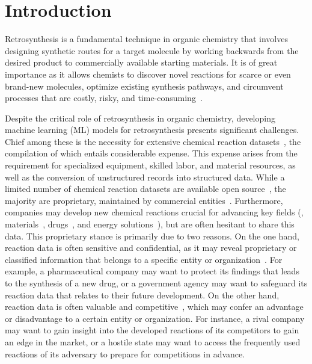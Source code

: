 \section{Introduction}\label{sec:intro}

Retrosynthesis is a fundamental technique in organic chemistry that involves designing synthetic routes for a target molecule by working backwards from the desired product to commercially available starting materials. It is of great importance as it allows chemists to discover novel reactions for scarce or even brand-new molecules, optimize existing synthesis pathways, and circumvent processes that are costly, risky, and time-consuming~\citep{subbaraman2011flawed,struble2020current}.

Despite the critical role of retrosynthesis in organic chemistry, developing machine learning (ML) models for retrosynthesis presents significant challenges. Chief among these is the necessity for extensive chemical reaction datasets~\citep{zhang2024retrosynthesis}, the compilation of which entails considerable expense. This expense arises from the requirement for specialized equipment, skilled labor, and material resources, as well as the conversion of unstructured records into structured data. While a limited number of chemical reaction datasets are available open source~\citep{lowe2012extraction,Lowe2017}, the majority are proprietary, maintained by commercial entities~\citep{goodman2009computer,lawson2014making,mayfield2017pistachio}. Furthermore, companies may develop new chemical reactions crucial for advancing key fields (\eg, materials~\citep{bozbag2012synthesis,fayette2014chemical}, drugs~\citep{blakemore2018organic}, and energy solutions~\citep{binder2009simple,poizot2011clean}), but are often hesitant to share this data. This proprietary stance is primarily due to two reasons. On the one hand, reaction data is often sensitive and confidential, as it may reveal proprietary or classified information that belongs to a specific entity or organization~\citep{shimizu2015privacy,simm2021splitting}. For example, a pharmaceutical company may want to protect its findings that leads to the synthesis of a new drug, or a government agency may want to safeguard its reaction data that relates to their future development. On the other hand, reaction data is often valuable and competitive~\citep{muetterties1977molecular,schooler2011unpublished}, which may confer an advantage or disadvantage to a certain entity or organization. For instance, a rival company may want to gain insight into the developed reactions of its competitors to gain an edge in the market, or a hostile state may want to access the frequently used reactions of its adversary to prepare for competitions in advance. 







